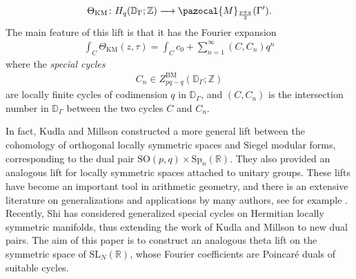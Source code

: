 \documentclass[a4paper,11pt]{amsart} %
\newcommand{\8}{\infty}
\newcommand{\Z}{\mathbb{Z}}
\newcommand{\SO}{\mathrm{SO}}
\newcommand{\SL}{\mathrm{SL}}
\newcommand{\Sp}{\mathrm{Sp}}
\newcommand{\KM}{\mathrm{KM}}
\newcommand{\BM}{\mathrm{BM}}
\newcommand{\D}{\mathbb{D}}
\newcommand{\R}{\mathbb{R}}
\newcommand{\Mcal}{\pazocal{M}}
\theoremstyle{mytheoremstyle}
\theoremstyle{remark}
\numberwithin{equation}{section}
\begin{document}
\begin{align} \label{KMlift intro}
\Theta_{\KM} \colon H_q(\D_\Gamma;\Z) \longrightarrow \Mcal_{\frac{p+q}{2}}(\Gamma').
\end{align}
The main feature of this lift is that it has the Fourier expansion
\begin{align}
\int_{C} \Theta_{\KM}(z,\tau) = \int_Cc_0+ \sum_{n=1}^\8 (C,C_n)q^n
\end{align}
where the {\em special cycles}
\begin{align}
C_n \in Z^{\BM}_{pq-q}(\D_\Gamma;\Z)
\end{align} are locally finite cycles of codimension $q$ in $\D_{\Gamma}$, and $(C,C_n)$
is the intersection number in $\D_\Gamma$ between the two cycles $C$ and $C_n$.



In fact, Kudla and Millson constructed a more general lift between the cohomology of orthogonal locally symmetric spaces and Siegel modular forms, corresponding to the dual pair $\SO(p,q) \times \Sp_n(\R)$. They also provided an analogous lift for locally symmetric spaces attached to unitary groups. These lifts have become an important tool in arithmetic geometry, and there is an extensive literature on generalizations and applications by many authors, see for example \cite{fbtwolifts,bfinj,bmm,blmm,EY20,fmbound1,fmcoef,funkmil,G20,garcia23,KZ25,MZ26,Z24}.
Recently, Shi \cite{shi} has considered generalized special cycles on Hermitian locally symmetric manifolds, thus extending the work of Kudla and Millson to new dual pairs.
The aim of this paper is to construct an analogous theta lift on the symmetric space of $\SL_N(\R) $, whose Fourier coefficients are Poincaré duals of suitable cycles.
\end{document}
